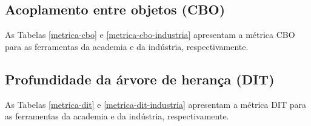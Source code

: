 
\subsection{Acoplamento entre objetos (CBO)}

As Tabelas \ref{metrica-cbo} e \ref{metrica-cbo-industria} apresentam a
métrica CBO para as ferramentas da academia e da indústria, respectivamente.



\subsection{Profundidade da árvore de herança (DIT)}

As Tabelas \ref{metrica-dit} e \ref{metrica-dit-industria} apresentam a
métrica DIT para as ferramentas da academia e da indústria, respectivamente.


